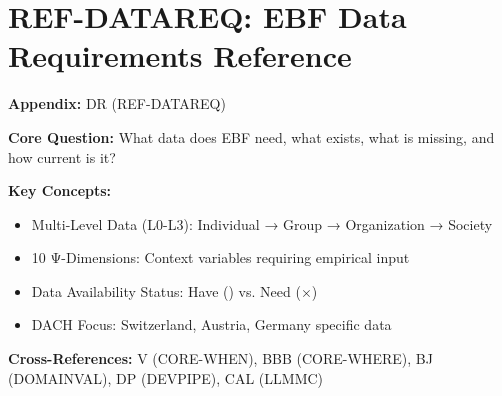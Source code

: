 \chapter{REF-DATAREQ: EBF Data Requirements Reference}
\label{app:dr}


\begin{tcolorbox}[colback=blue!5!white, colframe=blue!75!black,
    title=Quick Reference: Appendix DR]

\textbf{Appendix:} DR (REF-DATAREQ)

\textbf{Core Question:} What data does EBF need, what exists, what is missing, and how current is it?

\textbf{Key Concepts:}
\begin{itemize}[nosep]
\item Multi-Level Data (L0-L3): Individual → Group → Organization → Society
\item 10 Ψ-Dimensions: Context variables requiring empirical input
\item Data Availability Status: Have (\checkmark) vs. Need ($\times$)
\item DACH Focus: Switzerland, Austria, Germany specific data
\end{itemize}

\textbf{Cross-References:} V (CORE-WHEN), BBB (CORE-WHERE), BJ (DOMAINVAL), DP (DEVPIPE), CAL (LLMMC)
\end{tcolorbox}


\begin{abstract}
This appendix provides the comprehensive data requirements inventory for the Evidence-Based Framework (EBF). It documents all data needs across four hierarchical levels (L0: Individual, L1: Group, L2: Organization, L3: Society) and ten context dimensions ($\Psi$). For each data requirement, we specify: (1) what data is needed, (2) whether it currently exists, (3) primary data sources, (4) last update date, and (5) collection methodology. Special attention is given to DACH-region (Switzerland, Austria, Germany) empirical values with validated sources.
\end{abstract}


